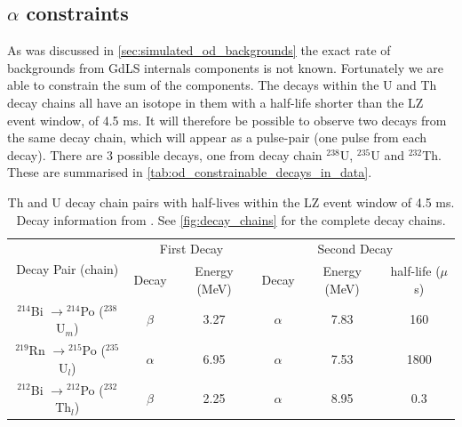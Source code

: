 \subsection{$\alpha$ constraints}
\par
As was discussed in \autoref{sec:simulated_od_backgrounds} the exact rate of backgrounds from GdLS internals components is not known.
Fortunately we are able to constrain the sum of the components. 
The decays within the U and Th decay chains all have an isotope in them with a half-life shorter than the LZ event window, of 4.5 ms.
It will therefore be possible to observe two decays from the same decay chain, which will appear as a pulse-pair (one pulse from each decay).
There are 3 possible decays, one from decay chain ${}^{238}$U, ${}^{235}$U and ${}^{232}$Th.
These are summarised in \autoref{tab:od_constrainable_decays_in_data}.

\begin{table}[]
    \centering
    \begin{tabular}{c|c|c|c|c|c}
        \multirow{2}{*}{Decay Pair (chain)}                    & \multicolumn{2}{c|}{First Decay}   & \multicolumn{3}{c}{Second Decay}    \\ 
                                                               & Decay    & Energy (MeV) & Decay    & Energy (MeV) & half-life ($\mu$s) \\ \hline
        ${}^{214}$Bi $\to {}^{214}$Po (${}^{238}$U$_{m}$)          & $\beta$  & 3.27         & $\alpha$ & 7.83         & 160   \\ 
        ${}^{219}$Rn $\to {}^{215}$Po (${}^{235}$U$_{l}$)          & $\alpha$ & 6.95         & $\alpha$ & 7.53         & 1800  \\ 
        ${}^{212}$Bi $\to {}^{212}$Po (${}^{232}$Th$_{l}$)         & $\beta$  & 2.25         & $\alpha$ & 8.95         & 0.3
    \end{tabular}
    \caption{Th and U decay chain pairs with half-lives within the LZ event window of 4.5 ms. 
             Decay information from \cite{radon_chains_ref}.
             See \autoref{fig:decay_chains} for the complete decay chains.}
    \label{tab:od_constrainable_decays_in_data}
\end{table}

